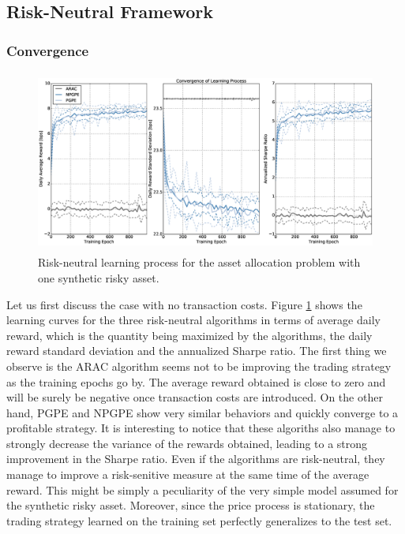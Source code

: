 \subsection{Risk-Neutral Framework}
\subsubsection{Convergence}
\begin{figure}[t!]
	\centering
	\includegraphics[height=6cm,width=1.0\textwidth]{Images/6_0_single_synthetic_neutral_convergence}
	\caption[Risk-neutral learning process for one synthetic risky asset.]{Risk-neutral learning process for the asset allocation problem with one synthetic risky asset.}
	\label{fig:single_synthetic_neutral_convergence}
\end{figure}
Let us first discuss the case with no transaction costs. Figure \ref{fig:single_synthetic_neutral_convergence} shows the learning curves for the three risk-neutral algorithms in terms of average daily reward, which is the quantity being maximized by the algorithms, the daily reward standard deviation and the annualized Sharpe ratio. The first thing we observe is the \gls{ARAC} algorithm seems not to be improving the trading strategy as the training epochs go by. The average reward obtained is close to zero and will be surely be negative once transaction costs are introduced. On the other hand, \gls{PGPE} and \gls{NPGPE} show very similar behaviors and quickly converge to a profitable strategy. It is interesting to notice that these algoriths also manage to strongly decrease the variance of the rewards obtained, leading to a strong improvement in the Sharpe ratio. Even if the algorithms are risk-neutral, they manage to improve a risk-senitive measure at the same time of the average reward. This might be simply a peculiarity of the very simple model assumed for the synthetic risky asset. Moreover, since the price process is stationary, the trading strategy learned on the training set perfectly generalizes to the test set. 

